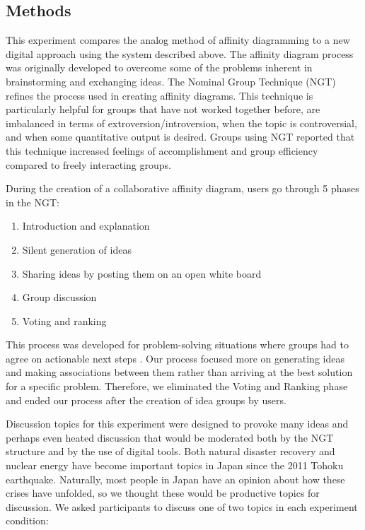 \documentclass{sigchi}
\begin{document}
\subsection{Methods}

This experiment compares the analog method of affinity diagramming to a new digital approach using the system described above. The affinity diagram process was originally developed to overcome some of the problems inherent in brainstorming and exchanging ideas\cite{kawakita1991original}. The Nominal Group Technique (NGT) refines the process used in creating affinity diagrams. This technique is particularly helpful for groups that have not worked together before, are imbalanced in terms of extroversion/introversion, when the topic is controversial, and when some quantitative output is desired. Groups using NGT reported that this technique increased feelings of accomplishment and group efficiency compared to freely interacting groups\cite{gallagher1993nominal}. 

During the creation of a collaborative affinity diagram, users go through 5 phases in the NGT:  
\begin{enumerate}
\item Introduction and explanation
\item Silent generation of ideas
\item Sharing ideas by posting them on an open white board
\item Group discussion
\item Voting and ranking
\end{enumerate}
This process was developed for problem-solving situations where groups had to agree on actionable next steps \cite{delbecq1971group}. Our process focused more on generating ideas and making associations between them rather than arriving at the best solution for a specific problem. Therefore, we eliminated the Voting and Ranking phase and ended our process after the creation of idea groups by users. 

Discussion topics for this experiment were designed to provoke many ideas and perhaps even heated discussion that would be moderated both by the NGT structure and by the use of digital tools. Both natural disaster recovery and nuclear energy have become important topics in Japan since the 2011 Tohoku earthquake. Naturally, most people in Japan have an opinion about how these crises have unfolded, so we thought these would be productive topics for discussion. We asked participants to discuss one of two topics in each experiment condition:
\end{document}
